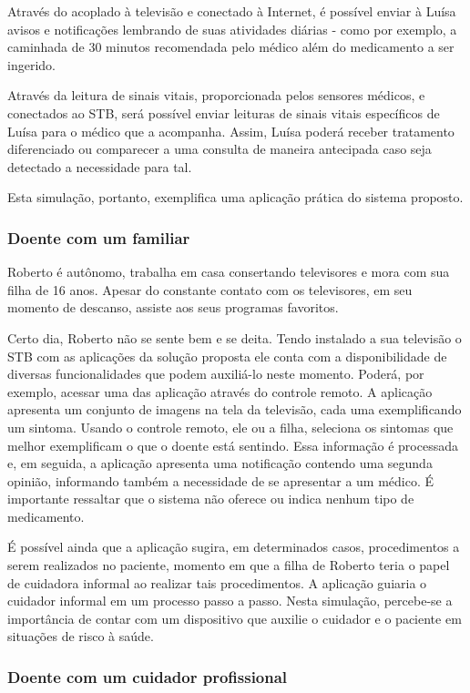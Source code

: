 Através do \stb[] acoplado à televisão e conectado à Internet, é
possível enviar à Luísa avisos e notificações lembrando de suas atividades
diárias - como por exemplo, a caminhada de 30 minutos recomendada pelo
médico além do medicamento a ser ingerido.

Através da leitura de sinais vitais, proporcionada pelos sensores médicos,
e conectados ao STB, será possível enviar leituras de sinais vitais específicos 
de Luísa para o médico que a acompanha. Assim, Luísa poderá receber tratamento
diferenciado ou comparecer a uma consulta de maneira antecipada caso seja
detectado a necessidade para tal.

Esta simulação, portanto, exemplifica uma aplicação prática do sistema 
proposto.

\subsubsection{Doente com um familiar}

Roberto é autônomo, trabalha em casa consertando televisores e mora com sua
filha de 16 anos. Apesar do constante contato com os televisores, em seu momento
de descanso, assiste aos seus programas favoritos.

Certo dia, Roberto não se sente bem e se deita. Tendo instalado a sua televisão
o STB com as aplicações da solução proposta ele conta com a disponibilidade de
diversas funcionalidades que podem auxiliá-lo neste momento. Poderá, por
exemplo, acessar uma das aplicação através do controle remoto. A aplicação
apresenta um conjunto de imagens na tela da televisão, cada uma exemplificando
um sintoma.  Usando o controle remoto, ele ou a filha, seleciona os sintomas que melhor
exemplificam o que o doente está sentindo. Essa informação é processada e, em seguida, a
aplicação apresenta uma notificação contendo uma segunda opinião, informando
também a necessidade de se apresentar a um médico. É importante ressaltar que
o sistema não oferece ou indica nenhum tipo de medicamento.

É possível ainda que a aplicação sugira, em determinados casos, procedimentos a
serem realizados no paciente, momento em que a filha de Roberto teria o papel de
cuidadora informal ao realizar tais procedimentos. A aplicação guiaria o
cuidador informal em um processo passo a passo. Nesta simulação,  percebe-se a
importância de contar com um dispositivo que auxilie o cuidador e o paciente em
situações de risco à saúde.

\subsubsection{Doente com um cuidador profissional}

